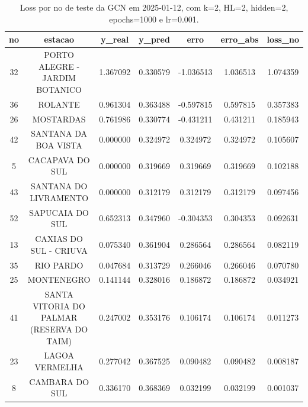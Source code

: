 \begin{table}[h]
\centering
\caption{Loss por no de teste da GCN em 2025-01-12, com k=2, HL=2, hidden=2, epochs=1000 e lr=0.001.}
\label{tab:gcn_loss_k2_hl2_h2_e1000_d20250112}
\begin{tabular}{ccccccc}
\toprule
no & estacao & y\_real & y\_pred & erro & erro\_abs & loss\_no \\
\midrule
32 & PORTO ALEGRE - JARDIM BOTANICO & 1.367092 & 0.330579 & -1.036513 & 1.036513 & 1.074359 \\
36 & ROLANTE & 0.961304 & 0.363488 & -0.597815 & 0.597815 & 0.357383 \\
26 & MOSTARDAS & 0.761986 & 0.330774 & -0.431211 & 0.431211 & 0.185943 \\
42 & SANTANA DA BOA VISTA & 0.000000 & 0.324972 & 0.324972 & 0.324972 & 0.105607 \\
5 & CACAPAVA DO SUL & 0.000000 & 0.319669 & 0.319669 & 0.319669 & 0.102188 \\
43 & SANTANA DO LIVRAMENTO & 0.000000 & 0.312179 & 0.312179 & 0.312179 & 0.097456 \\
52 & SAPUCAIA DO SUL & 0.652313 & 0.347960 & -0.304353 & 0.304353 & 0.092631 \\
13 & CAXIAS DO SUL - CRIUVA & 0.075340 & 0.361904 & 0.286564 & 0.286564 & 0.082119 \\
35 & RIO PARDO & 0.047684 & 0.313729 & 0.266046 & 0.266046 & 0.070780 \\
25 & MONTENEGRO & 0.141144 & 0.328016 & 0.186872 & 0.186872 & 0.034921 \\
41 & SANTA VITORIA DO PALMAR (RESERVA DO TAIM) & 0.247002 & 0.353176 & 0.106174 & 0.106174 & 0.011273 \\
23 & LAGOA VERMELHA & 0.277042 & 0.367525 & 0.090482 & 0.090482 & 0.008187 \\
8 & CAMBARA DO SUL & 0.336170 & 0.368369 & 0.032199 & 0.032199 & 0.001037 \\
\bottomrule
\end{tabular}
\end{table}
